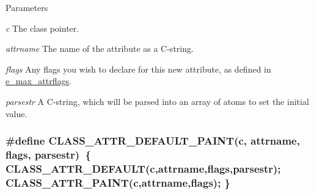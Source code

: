 \begin{DoxyParams}{Parameters}
\item[{\em c}]The class pointer. \item[{\em attrname}]The name of the attribute as a C-\/string. \item[{\em flags}]Any flags you wish to declare for this new attribute, as defined in \hyperlink{group__attr_gaf296cfc6741bb19207f6ed8062809115}{e\_\-max\_\-attrflags}. \item[{\em parsestr}]A C-\/string, which will be parsed into an array of atoms to set the initial value. \end{DoxyParams}
\hypertarget{group__attr_gabb817cf3673852f60f14ee635faa5e17}{
\subsubsection[{CLASS\_\-ATTR\_\-DEFAULT\_\-PAINT}]{\setlength{\rightskip}{0pt plus 5cm}\#define CLASS\_\-ATTR\_\-DEFAULT\_\-PAINT(c, \/  attrname, \/  flags, \/  parsestr)~\{ CLASS\_\-ATTR\_\-DEFAULT(c,attrname,flags,parsestr); CLASS\_\-ATTR\_\-PAINT(c,attrname,flags); \}}}
\label{group__attr_gabb817cf3673852f60f14ee635faa5e17}


